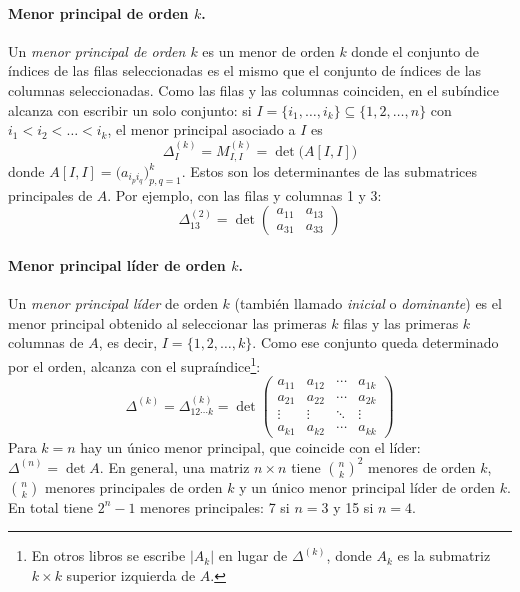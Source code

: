 \documentclass{article}
\begin{document}
\paragraph{Menor principal de orden \(k\).}
Un \emph{menor principal de orden \(k\)} es un menor de orden \(k\) donde el conjunto de índices de las filas seleccionadas es el mismo que el conjunto de índices de las columnas seleccionadas. Como las filas y las columnas coinciden, en el subíndice alcanza con escribir un solo conjunto: si \(I=\{i_1,\dots,i_k\}\subseteq\{1,2,\dots,n\}\) con \(i_1<i_2<\dots<i_k\), el menor principal asociado a \(I\) es
\[
\Delta^{(k)}_I=M^{(k)}_{I,I}=\det\bigl(A[I,I]\bigr)
\]
donde \(A[I,I]=\bigl(a_{i_pi_q}\bigr)_{p,q=1}^k\). Estos son los determinantes de las submatrices principales de \(A\). Por ejemplo, con las filas y columnas 1 y 3:
\[
\Delta^{(2)}_{13}=\det\begin{pmatrix}a_{11}&a_{13}\\a_{31}&a_{33}\end{pmatrix}
\]

\paragraph{Menor principal líder de orden \(k\).}
Un \emph{menor principal líder} de orden \(k\) (también llamado \emph{inicial} o \emph{dominante}) es el menor principal obtenido al seleccionar las primeras \(k\) filas y las primeras \(k\) columnas de \(A\), es decir, \(I=\{1,2,\dots,k\}\). Como ese conjunto queda determinado por el orden, alcanza con el supraíndice\footnote{En otros libros se escribe \(|A_k|\) en lugar de \(\Delta^{(k)}\), donde \(A_k\) es la submatriz \(k\times k\) superior izquierda de \(A\).}:
\[
\Delta^{(k)}=\Delta^{(k)}_{12\cdots k}=\det\begin{pmatrix}
a_{11}&a_{12}&\cdots&a_{1k}\\
a_{21}&a_{22}&\cdots&a_{2k}\\
\vdots&\vdots&\ddots&\vdots\\
a_{k1}&a_{k2}&\cdots&a_{kk}
\end{pmatrix}
\]
Para \(k=n\) hay un único menor principal, que coincide con el líder: \(\Delta^{(n)}=\det A\). En general, una matriz \(n\times n\) tiene \(\binom{n}{k}^2\) menores de orden \(k\), \(\binom{n}{k}\) menores principales de orden \(k\) y un único menor principal líder de orden \(k\). En total tiene \(2^n-1\) menores principales: 7 si \(n=3\) y 15 si \(n=4\).

\medskip
\end{document}
